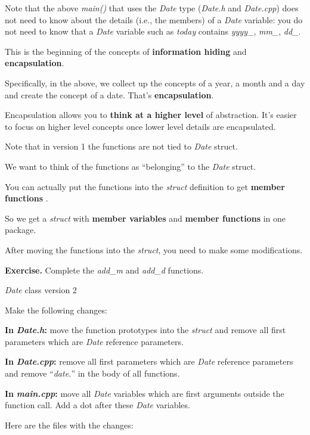 \documentclass[
]{article}
\begin{document}
Note that the above \emph{main()} that uses the \emph{Date} type
(\emph{Date.h} and \emph{Date.cpp}) does not need to know about the
details (i.e., the members) of a \emph{Date} variable: you do not need
to know that a \emph{Date} variable such as \emph{today} contains
\emph{yyyy\_}, \emph{mm\_}, \emph{dd\_}.

This is the beginning of the concepts of \textbf{information hiding} and
\textbf{encapsulation}.

Specifically, in the above, we collect up the concepts of a year, a
month and a day and create the concept of a date. That's
\textbf{encapsulation}.

Encapsulation allows you to \textbf{think at a higher level} of
abstraction. It's easier to focus on higher level concepts once lower
level details are encapsulated.

Note that in version 1 the functions are not tied to \emph{Date} struct.

We want to think of the functions as ``belonging'' to the \emph{Date}
struct.

You can actually put the functions into the \emph{struct} definition to
get \textbf{member functions} .

So we get a \emph{struct} with \textbf{member variables} and
\textbf{member functions} in one package.

After moving the functions into the \emph{struct}, you need to make some
modifications.

\textbf{Exercise.} Complete the \emph{add\_m} and \emph{add\_d}
functions.

\emph{Date} class version 2

Make the following changes:

\textbf{In }\emph{\textbf{Date.h}}\textbf{:} move the function
prototypes into the \emph{struct} and remove all first parameters which
are \emph{Date} reference parameters.

\textbf{In }\emph{\textbf{Date.cpp}}\textbf{:} remove all first
parameters which are \emph{Date} reference parameters and remove
``\emph{date.}'' in the body of all functions.

\textbf{In }\emph{\textbf{main.cpp}}\textbf{:} move all \emph{Date}
variables which are first arguments outside the function call. Add a dot
after these \emph{Date} variables.

Here are the files with the changes:
\end{document}
